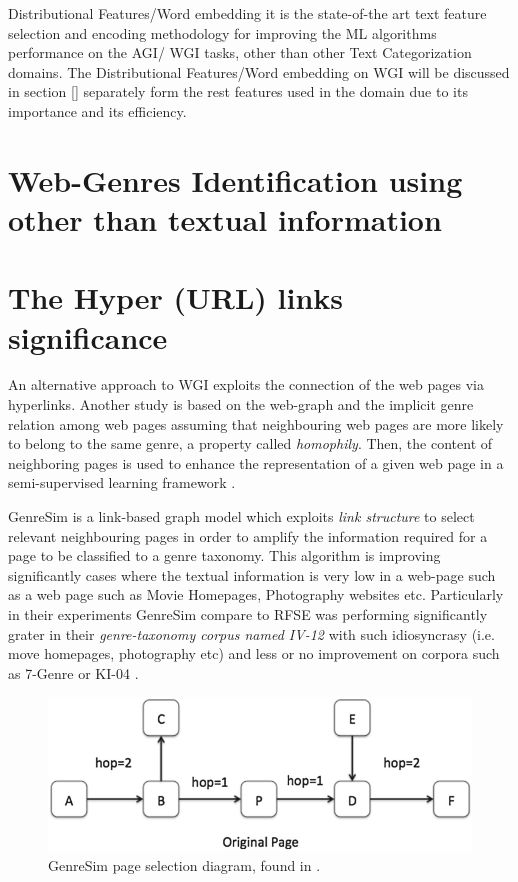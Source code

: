 Distributional Features/Word embedding it is the state-of-the art text feature selection and encoding methodology for improving the ML algorithms performance on the  AGI/ WGI tasks, other than other Text Categorization domains. The Distributional Features/Word embedding on WGI will be discussed in section \ref{} separately form the rest features used in the domain due to its importance and its efficiency. 


\section{Web-Genres Identification using other than textual information}\label{chap:relevant_work:sec:intro}

\section{The Hyper (URL) links significance}\label{chap:relevant_work:sec:intro}

An alternative approach to WGI exploits the connection of the web pages via hyperlinks. 
Another study is based on the web-graph and the implicit genre relation among web pages assuming that neighbouring web pages are more likely to belong to the same genre, a property called \textit{homophily}. Then, the content of neighboring pages is used to enhance the representation of a given web page in a semi-supervised learning framework \parencite{asheghi2014semi}.

GenreSim is a link-based graph model which exploits \textit{link structure} to select relevant neighbouring pages in order to amplify the information required for a page to be classified to a genre taxonomy. This algorithm is improving significantly cases where the textual information is very low in a web-page such as a web page such as Movie Homepages, Photography websites etc. Particularly in their experiments GenreSim compare to RFSE was performing significantly grater in their \textit{genre-taxonomy corpus named IV-12} with such idiosyncrasy (i.e. move homepages, photography etc) and less or no improvement on corpora such as 7-Genre or KI-04 \parencite{zhu2011enhance,zhu2016exploiting}.

\begin{figure}[t]
	\begin{center}
    	\includegraphics[scale=0.95]{Figures/GenreSim_Draw.eps}
		\caption{GenreSim page selection diagram, found in  \parencite{zhu2016exploiting}.}
		\label{fiig:GenreSim_Draw}
	\end{center}
\end{figure}

